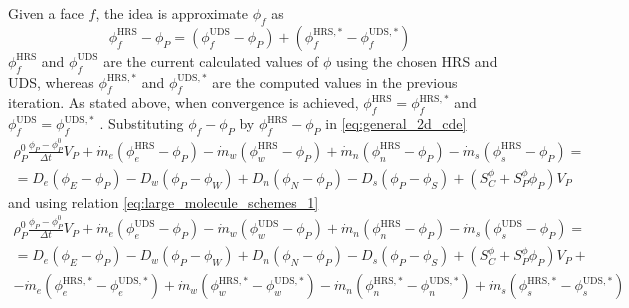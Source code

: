 Given a face $f$, the idea is approximate $\phi_f$ as
\begin{equation} \label{eq:large_molecule_schemes_1}
	\phi_f^\text{HRS} - \phi_P = 
	(\phi_f^\text{UDS} - \phi_P) + 
	(\phi_f^{\text{HRS},\ast} - \phi_f^{\text{UDS},\ast})
\end{equation}
$\phi_f^\text{HRS}$ and $\phi_f^\text{UDS}$ are the current calculated values of $\phi$ using the chosen HRS and UDS, whereas $\phi_f^{\text{HRS},\ast}$ and $\phi_f^{\text{UDS},\ast}$ are the computed values in the previous iteration. As stated above, when convergence is achieved, $\phi_f^\text{HRS} = \phi_f^{\text{HRS},\ast}$ and $\phi_f^\text{UDS} = \phi_f^{\text{UDS},\ast}$ \cite{cttc_cde_2021}. Substituting $\phi_f - \phi_P$ by $\phi_f^\text{HRS} - \phi_P$ in \eqref{eq:general_2d_cde}
\begin{multline}
	\rho_P^0 \frac{\phi_P - \phi_P^0}{\Delta t} V_P
	+ \dot{m}_e (\phi_e^\text{HRS} - \phi_P) - \dot{m}_w (\phi_w^\text{HRS} - \phi_P) 
	+ \dot{m}_n (\phi_n^\text{HRS} - \phi_P) - \dot{m}_s (\phi_s^\text{HRS} - \phi_P) 
	= \\
	= D_e (\phi_E - \phi_P) - D_w (\phi_P - \phi_W)
	+ D_n (\phi_N - \phi_P) - D_s (\phi_P - \phi_S)
	+ (S_C^\phi + S_P^\phi \phi_P) V_P
\end{multline}
and using relation \eqref{eq:large_molecule_schemes_1}
\begin{multline}
	\rho_P^0 \frac{\phi_P - \phi_P^0}{\Delta t} V_P
	+ \dot{m}_e (\phi_e^\text{UDS} - \phi_P) - \dot{m}_w (\phi_w^\text{UDS} - \phi_P) 
	+ \dot{m}_n (\phi_n^\text{HRS} - \phi_P) - \dot{m}_s (\phi_s^\text{UDS} - \phi_P) 
	= \\
	= D_e (\phi_E - \phi_P) - D_w (\phi_P - \phi_W)
	+ D_n (\phi_N - \phi_P) - D_s (\phi_P - \phi_S)
	+ (S_C^\phi + S_P^\phi \phi_P) V_P + \\
	- \dot{m}_e (\phi_e^{\text{HRS},\ast} - \phi_e^{\text{UDS},\ast}) 
	+ \dot{m}_w (\phi_w^{\text{HRS},\ast} - \phi_w^{\text{UDS},\ast}) 
	- \dot{m}_n (\phi_n^{\text{HRS},\ast} - \phi_n^{\text{UDS},\ast}) 
	+ \dot{m}_s (\phi_s^{\text{HRS},\ast} - \phi_s^{\text{UDS},\ast})
\end{multline}





\cite{cfd_online_schemes}

